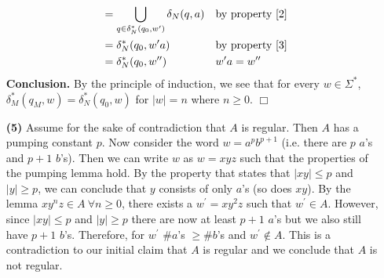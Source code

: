 \documentclass [10pt]{article}
\begin{document}
\begin{enumerate}
\begin{align}
		&= \bigcup\limits_{q \in \delta^{*}_{N}(q_{0},w^{\prime})} \delta_{N}(q,a) && \text{by property \ref{2}} \nonumber \\
		&= \delta^{*}_{N}(q_{0},w^{\prime}a) && \text{by property \ref{3}} \nonumber \\
		&= \delta^{*}_N(q_{0},w^{\prime\prime}) && \text{$w^{\prime}a = w^{\prime\prime}$} \nonumber
	\end{align}
	\textbf{Conclusion.} By the principle of induction, we see that for every $w\in\Sigma^{*}$, $\delta^{*}_{M}(q_{M},w)=\delta^{*}_{N}(q_{0},w)$ for $\left| w \right| = n$ where $n \ge 0$. $\Box$
	\item[\textbf{(5)}]Assume for the sake of contradiction that $A$ is regular. Then $A$ has a pumping constant $p$. Now consider the word $w = a^{p}b^{p+1}$ (i.e. there are $p$ $a$'s and $p+1$ $b$'s). Then we can write $w$ as $w = xyz$ such that the properties of the pumping lemma hold. By the property that states that $\left|xy\right| \le p$ and $\left|y\right| \ge p$, we can conclude that $y$ consists of only $a$'s (so does $xy$). By the lemma $xy^{n}z \in A\:\forall n \ge 0$, there exists a $w^{\prime} = xy^{2}z$ such that $w^{\prime} \in A$. However, since $\left|xy\right| \le p$ and $\left|y\right| \ge p$ there are now at least $p + 1$ $a$'s but we also still have $p + 1$ $b$'s. Therefore, for $w^{\prime}$ $\# a$'s $\ge \# b$'s and $w^{\prime} \notin A$. This is a contradiction to our initial claim that $A$ is regular and we conclude that $A$ is not regular.
\end{enumerate}
\end{document}
